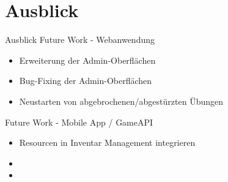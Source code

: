 \section{Ausblick}

\begin{frame}{Ausblick}
	Future Work - Webanwendung
	\begin{itemize}
		\item Erweiterung der Admin-Oberflächen
		\item Bug-Fixing der Admin-Oberflächen
		\item Neustarten von abgebrochenen/abgestürzten Übungen
	\end{itemize}
    Future Work - Mobile App / GameAPI
	\begin{itemize}
		\item Resourcen in Inventar Management integrieren
		\item 
		\item
	\end{itemize}
\end{frame}